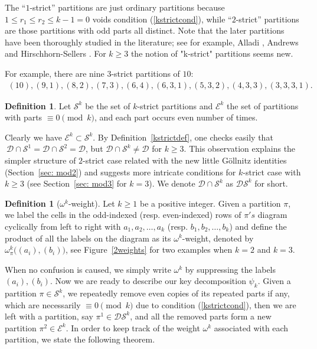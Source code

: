 \documentclass[12pt]{amsart}
\numberwithin{equation}{section}
\theoremstyle{plain}
\theoremstyle{definition}
\newtheorem{Def}[theorem]{Definition}
\begin{document}
The ``$1$-strict'' partitions are just ordinary partitions because $1\leq r_1\leq r_2\leq k-1=0$ voids  condition (\ref{kstrictcond}), while  ``$2$-strict'' partitions are those partitions with odd parts all distinct.
Note that the later partitions have been thoroughly studied in the literature; see for example,  Alladi \cite{alla}, Andrews \cite{and1,and2} and Hirschhorn-Sellers \cite{hs}. For  $k\geq 3$ the notion of "k-strict" partitions seems new.



For example, there are nine $3$-strict partitions of $10$:
\begin{gather*}
(10), (9,1), (8,2), (7,3), (6,4),
(6,3,1), (5,3,2), (4,3,3), (3,3,3,1).
\end{gather*}








\begin{Def}
Let $\mathcal{S}^k$ be  the set of $k$-strict partitions and 
$\mathcal{E}^k$  the set of partitions with parts $\equiv 0 \pmod k$, and each part occurs even number of times.
\end{Def}

Clearly we have $\mathcal{E}^k\subset \mathcal{S}^k$.
By Definition~\ref{kstrictdef}, one checks easily that $\ \mathcal{D}\cap \mathcal{S}^1= \mathcal{D}\cap \mathcal{S}^2=\mathcal{D}$, 
but $ \mathcal{D}\cap \mathcal{S}^k\neq \mathcal{D}$ for $k\geq 3$. 
This  observation explains the simpler structure of $2$-strict case related with the new little G\"{o}llnitz identities (Section~\ref{sec: mod2}) and suggests  more intricate conditions for $k$-strict case with  $k\geq 3$ (see Section~\ref{sec: mod3} for $k=3$).  We denote $ \mathcal{D}\cap \mathcal{S}^k$ as $\mathcal{DS}^k$ for short. 

\begin{Def}[$\omega^k$-weight] Let $k\geq 1$ be a positive integer.
Given a partition $\pi$, 
we label 
the cells in the odd-indexed (resp. even-indexed) rows of $\pi's$ 
diagram cyclically from left to right with $a_1, a_2, \ldots, a_k$ (resp. $b_1, b_2, \ldots, b_k$) and define  the product of all the labels on the  diagram as its 
$\omega^k$-weight, denoted by
$\omega_{\pi}^{k}\big((a_i), (b_i)\big)$, see  Figure~\ref{2weights}
for two examples when $k=2$ and $k=3$.
\end{Def}

When no confusion is caused, we simply write $\omega^k$ by
suppressing  the labels $(a_i), (b_i)$. Now we are ready to describe our key decomposition $\psi_k$. Given a partition $\pi\in\mathcal{S}^k$, we repeatedly remove even copies of its repeated parts if any, which are necessarily $\equiv 0 \pmod k$  due to condition (\ref{kstrictcond}), then we are left with a partition, say $\pi^1\in \mathcal{DS}^k$, and all the removed parts form a new partition $\pi^2\in\mathcal{E}^k$. In order  to keep track of the weight $\omega^{k}$ associated with each partition, we state the following theorem.
\end{document}
